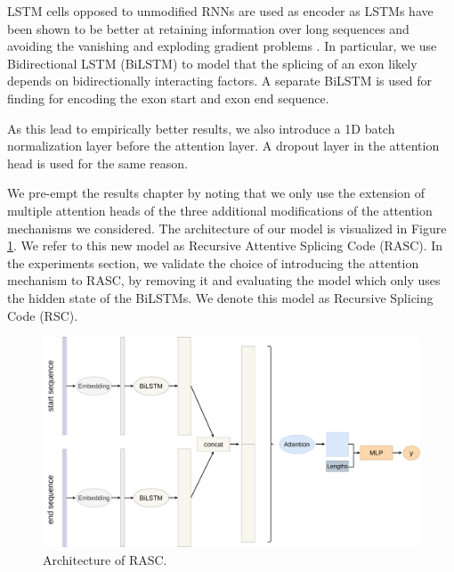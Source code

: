 LSTM cells opposed to unmodified RNNs are used as encoder as LSTMs have been shown to be better at retaining information over long sequences and avoiding the vanishing and exploding gradient problems \cite{lstm}. In particular, we use Bidirectional LSTM (BiLSTM) \cite{bidirection} to model that the splicing of an exon likely depends on bidirectionally interacting factors. A separate BiLSTM is used for finding for encoding the exon start and exon end sequence. 

As this lead to empirically better results, we also introduce a 1D batch normalization layer \cite{batchnormalization} before the attention layer. A dropout layer in the attention head is used for the same reason. 

We pre-empt the results chapter by noting that we only use the extension of multiple attention heads of the three additional modifications of the attention mechanisms we considered. 
The architecture of our model is visualized in Figure \ref{fig:attnbilstm}. We refer to this new model as Recursive Attentive Splicing Code (RASC). In the experiments section, we validate the choice of introducing the attention mechanism to RASC, by removing it and evaluating the model which only uses the hidden state of the BiLSTMs. We denote this model as Recursive Splicing Code (RSC).
\begin{figure}
	\centering\includegraphics[width=1\textwidth]{../visualizations/ch4-methods/visualizations-AttnBiLSTM.pdf} 
	\caption{Architecture of RASC. }
	\label{fig:attnbilstm}
\end{figure}


